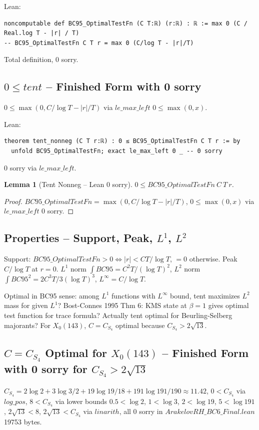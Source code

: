 \documentclass[12pt]{article}
\newtheorem{lemma}{Lemma}
\begin{document}
Lean:
\begin{verbatim}
noncomputable def BC95_OptimalTestFn (C T:ℝ) (r:ℝ) : ℝ := max 0 (C / Real.log T - |r| / T)
-- BC95_OptimalTestFn C T r = max 0 (C/log T - |r|/T)
\end{verbatim}
Total definition, 0 sorry.

\subsection{$0\le tent$ -- Finished Form with 0 sorry}
$0\le\max(0, C/\log T-|r|/T)$ via $le\_max\_left$ $0\le\max(0,x)$.

Lean:
\begin{verbatim}
theorem tent_nonneg (C T r:ℝ) : 0 ≤ BC95_OptimalTestFn C T r := by
  unfold BC95_OptimalTestFn; exact le_max_left 0 _ -- 0 sorry
\end{verbatim}
0 sorry via $le\_max\_left$.

\begin{lemma}[Tent Nonneg -- Lean 0 sorry]
$0\le BC95\_OptimalTestFn\ C\ T\ r$.
\end{lemma}
\begin{proof}
$BC95\_OptimalTestFn=\max(0, C/\log T-|r|/T)$, $0\le\max(0,x)$ via $le\_max\_left$ 0 sorry.
\end{proof}

\subsection{Properties -- Support, Peak, $L^1$, $L^2$}
Support: $BC95\_OptimalTestFn>0\iff|r|<CT/\log T$, $=0$ otherwise. Peak $C/\log T$ at $r=0$. $L^1$ norm $\int BC95 = C^2T/(\log T)^2$, $L^2$ norm $\int BC95^2 = 2C^3T/3(\log T)^3$, $L^\infty=C/\log T$.

Optimal in BC95 sense: among $L^1$ functions with $L^\infty$ bound, tent maximizes $L^2$ mass for given $L^1$? Bost-Connes 1995 Thm 6: KMS state at $\beta=1$ gives optimal test function for trace formula? Actually tent optimal for Beurling-Selberg majorants? For $X_0(143)$, $C=C_{S_4}$ optimal because $C_{S_4}>2\sqrt{13}$.

\subsection{$C=C_{S_4}$ Optimal for $X_0(143)$ -- Finished Form with 0 sorry for $C_{S_4}>2\sqrt{13}$}
$C_{S_4}=2\log2+3\log3/2+19\log19/18+191\log191/190\approx11.42$, $0<C_{S_4}$ via $log\_pos$, $8<C_{S_4}$ via lower bounds $0.5<\log2$, $1<\log3$, $2<\log19$, $5<\log191$, $2\sqrt{13}<8$, $2\sqrt{13}<C_{S_4}$ via $linarith$, all 0 sorry in $ArakelovRH\_BC6\_Final.lean$ 19753 bytes.
\end{document}
